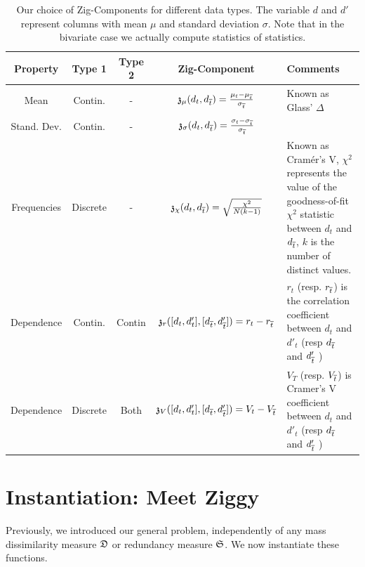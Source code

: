 \begin{table}[t]
    \centering
    \begin{tabular}{ccccp{8cm}}
      \hline
      Property & Type 1 & Type 2 & Zig-Component & Comments\\
      \hline
      Mean        & Contin.  & - &
      $  \mathfrak{z}_\mu (d_t, d_{\overline{t}}) = \frac{\mu_t - \mu_{\overline{t}}}{
      \sigma_{\overline{t}}}$&  Known as Glass' $\Delta$  \\

     Stand. Dev.& Contin.  & - &
      $ \mathfrak{z}_\sigma (d_t, d_{\overline{t}}) =  \frac{\sigma_t - \sigma_{\overline{t}}}{ \sigma_{\overline{t}}}$ & \\
    
      Frequencies & Discrete & - & 
    $  \mathfrak{z}_\chi (d_t, d_{\overline{t}}) =  \sqrt{\frac{\chi^2}{N(k - 1)}}$ & Known
          as Cram\'er's V, $\chi^2$ represents the value of the
          goodness-of-fit $\chi^2$ statistic between $d_t$ and $d_{\overline{t}}$, $k$
          is the number of distinct values.\\
      
          \hline
      Dependence  & Contin. & Contin & $
      \mathfrak{z}_r ([d_t, d'_t ], [d_{\overline{t}}, d'_{\overline{t}} ]) =     r_t - r_{\overline{t}} $ & 
      $r_t$ (resp. $r_{\overline{t}}$) is the correlation coefficient between $d_t$
      and  $d'_t$ (resp   $d_{\overline{t}}$ and  $d'_{\overline{t}}$ ) \\
      Dependence  & Discrete & Both &

      $ \mathfrak{z}_V ([d_t, d'_t ], [d_{\overline{t}}, d'_{\overline{t}} ]) = V_t - V_{\overline{t}} $ &
           $V_T$ (resp. $V_{\overline{t}}$) is Cramer's V coefficient between $d_t$
      and  $d'_t$ (resp   $d_{\overline{t}}$ and  $d'_{\overline{t}}$ ) \\ 
      \hline
    \end{tabular}
\caption{Our choice of Zig-Components for different data types. The variable
    $d$ and $d'$ represent columns with mean $\mu$ and
    standard deviation $\sigma$. Note that in the bivariate case we actually compute statistics of statistics.}
    \label{tab:dissim}
\end{table}

\section{Instantiation: Meet Ziggy}
\label{sec:instantiation}
Previously, we introduced our general problem, independently of any mass
dissimilarity measure $\mathfrak{D}$ or redundancy measure $\mathfrak{S}$. We now
instantiate these functions.

